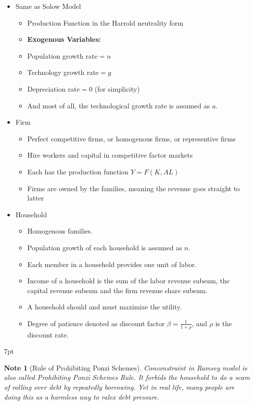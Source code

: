 \documentclass{article}
\providecommand{\tightlist}{
  \setlength{\itemsep}{0pt}
  \setlength{\parskip}{0pt}}
\newenvironment{blueblock}{
\def\FrameCommand{
  \hspace{1pt}
    {\color{DarkBlue}
    \vrule width 2pt}
    {\color{blueshade}
    \vrule width 4pt}
  \colorbox{blueshade}
}
\MakeFramed{
  \advance
  \hsize-
  \width
  \FrameRestore}
\noindent\hspace{-4.55pt}%
\begin{adjustwidth}{}{7pt}
\vspace{2pt}\vspace{2pt}
}
{\vspace{2pt}\end{adjustwidth}\endMakeFramed}
\newtheorem{note}{Note}
\begin{document}
\begin{itemize}
  \item Same as Solow Model
    \begin{itemize}
    \tightlist
      \item Production Function in the Harrold neutrality form 
      \item \textbf{Exogenous Variables:} 
      \item Population growth rate$=n$
      \item Technology growth rate$=g$ 
      \item Depreciation rate$=0$ (for simplicity)
      \item And most of all, the technological growth rate is assumed as $a$.
    \end{itemize}
  \item Firm
    \begin{itemize}
    \tightlist
      \item Perfect competitive firms, or homogenous firms, or representive firms
      \item Hire workers and capital in competitive factor markets
      \item Each has the production function $Y=F(K,AL)$
      \item Firms are owned by the families, meaning the revenue goes straight to
      latter
    \end{itemize}
  \item Household
    \begin{itemize}
    \tightlist
      \item Homogenous families.
      \item Population growth of each household is assumed as $n$.
      \item Each member in a household provides one unit of labor.
      \item Income of a household is the sum of the labor revenue subsum, the capital revenue subsum and the firm revenue share subsum.
      \item A household should and must maximize the utility.
      \item Degree of patience denoted as discount factor $\beta=\frac{1}{1+\rho}$, and $\rho$ is the discount rate.
    \end{itemize}
\end{itemize}



\begin{blueblock}
\begin{note}[Rule of Prohibiting Ponzi Schemes]
Conconstraint in Ramsey model is also called Prohibiting Ponzi Schemes Rule. It forbids the household to do a scam of rolling over debt by repeatedly borrowing. Yet in real life, many people are doing this as a harmless way to ralex debt pressure.
\end{note}
\end{blueblock}
\end{document}

